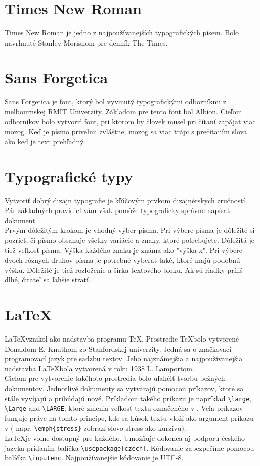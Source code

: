 \documentclass[11pt, a4paper, titlepage]{article}
\begin{document}
\section{Times New Roman}
Times New Roman je jedno z najpoužívanejších typografických písem. Bolo navrhnuté Stanley Morisnom pre denník The Times. \cite{Graphic}

\section{Sans Forgetica}
Sans Forgetica je font, ktorý bol vyvinutý typografickými odborníkmi z melbournskej RMIT Univerzity. Základom pre tento font bol Albion. Cieľom odborníkov bolo vytvoriť font, pri ktorom by človek musel pri čítaní zapájať viac mozog. Keď je písmo priveľmi zvláštne, mozog sa viac trápi s prečítaním slova ako keď je text prehľadný. \cite{Quark}

\section{Typografické typy}
Vytvoriť dobrý dizajn typografie je kľúčovým prvkom dizajnérskych zručností. Pár základných pravidiel vám však pomôže typograficky správne napísať dokument. \\
Prvým dôležitým krokom je vhodný výber písma. Pri výbere písma je dôležité si pozrieť, či písmo obsahuje všetky variácie a znaky, ktoré potrebujete. 
Dôležitá je tiež veľkosť písma. Výška každého znaku je známa ako "výška x". Pri výbere dvoch rôznych druhov písma je potrebné vyberať také, ktoré majú podobnú výšku.
Dôležité je tiež rozloženie a šírka textového bloku. Ak sú riadky príliš dlhé, čitateľ sa ľahšie stratí. \cite{Typography}

\section{\LaTeX~}
\LaTeX vznikol ako nadstavba programu \TeX. Prostredie \TeX bolo vytvorené Donaldom E. Knuthom zo Stanfordskej univerzity. Jedná sa o značkovací programovací jazyk pre sadzbu textov. Jeho najznámejšia a najpoužívanejšia nadstavba \LaTeX bola vytvorená v roku 1938 L. Lamportom. \\
Cieľom pre vytvorenie takéhoto prostredia bolo uľahčiť tvorbu bežných dokumentov. Jednotlivé dokumenty sa vytvárajú pomocou príkazov, ktoré sa stále vyvíjajú a pribúdajú nové. Príkladom takého príkazu je napríklad \verb|\large|, \verb|\Large| and \verb|\LARGE|, ktoré zmenia veľkosť textu označeného v {}. Veľa príkazov funguje práve na tomto princípe, kde sa kúsok textu vloží ako argument príkazu v {}( napr. \verb|\emph{stress}| zobrazí slovo stress ako kurzívu). \\
\LaTeX je voľne dostupný pre každého. Umožňuje dokonca aj podporu českého jazyka pridaním balíčka \verb|\usepackage[czech]|. Kódovanie zabezpečíme pomocou balíčka \verb|\inputenc|. Najpoužívanejšie kódovanie je UTF-8. \cite{Helmut} \cite{Rybicka} \cite{Strapa}

\newpage


\end{document}
